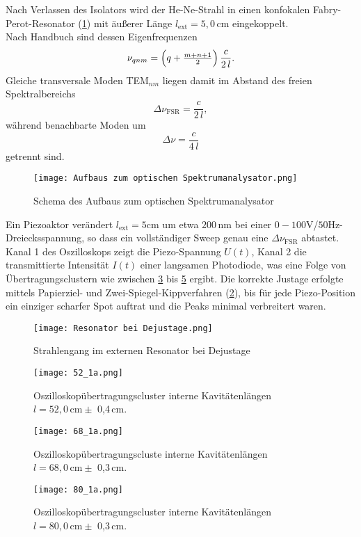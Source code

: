Nach Verlassen des Isolators wird der He-Ne-Strahl in einen konfokalen Fabry-Perot-Resonator (\cref{fig:Spektrumanalysator}) mit äußerer Länge $l_{\mathrm{ext}} = 5{,}0\,\si{\centi\meter}$ eingekoppelt. \\
Nach Handbuch \cite{praktikum} sind dessen Eigenfrequenzen
\begin{equation}
  \nu_{qnm}
  = \Bigl(q + \tfrac{m+n+1}{2}\Bigr)\,\frac{c}{2\,l}.
\end{equation}
Gleiche transversale Moden TEM$_{nm}$ liegen damit im Abstand des freien Spektralbereichs
\begin{equation*}
  \Delta\nu_{\mathrm{FSR}}
  = \frac{c}{2\,l},
\end{equation*}
während benachbarte Moden um
\begin{equation*}
  \Delta\nu
  = \frac{c}{4\,l}
\end{equation*}
getrennt sind.
\begin{figure}[htbp]
  \centering
  \texttt{[image: Aufbaus zum optischen Spektrumanalysator.png]}
  \caption{Schema des Aufbaus zum optischen Spektrumanalysator}
  \label{fig:Spektrumanalysator}
\end{figure}

Ein Piezoaktor verändert $l_{\mathrm{ext}} = 5 \si{\cm}$ um etwa $200\,\si{\nm}$ bei einer $0-100 \si{\volt}  $/$50 \si{\hertz}$-Dreiecksspannung, so dass ein vollständiger Sweep genau eine $\Delta\nu_{\mathrm{FSR}}$ abtastet. 
Kanal 1 des Oszilloskops zeigt die Piezo-Spannung $U(t)$, Kanal 2 die transmittierte Intensität $I(t)$ einer langsamen Photodiode, was eine Folge von Übertragungsclustern wie zwischen \cref{fig:9a} bis \cref{fig:9c} ergibt. 
Die korrekte Justage erfolgte mittels Papierziel- und Zwei-Spiegel-Kippverfahren (\cref{fig:Resonator}), bis für jede Piezo-Position ein einziger scharfer Spot auftrat und die Peaks minimal verbreitert waren.
\begin{figure}[htbp]
  \centering
  \texttt{[image: Resonator bei Dejustage.png]}
  \caption{Strahlengang im externen Resonator bei Dejustage}
  \label{fig:Resonator}
\end{figure}
\begin{figure}[htbp]
    \centering
    \texttt{[image: 52\_1a.png]}
     \caption{Oszilloskopübertragungscluster interne Kavitätenlängen $l = 52,0\,\si{\centi\meter} \pm$ 0{,}4\,\si{\centi\meter}.}
    \label{fig:9a}
\end{figure}
  \begin{figure}[htbp]
    \centering
    \texttt{[image: 68\_1a.png]}
     \caption{Oszilloskopübertragungscluste interne Kavitätenlängen $l = 68,0\,\si{\centi\meter} \pm$ 0{,}3\,\si{\centi\meter}.}
    \label{fig:9b}
  \end{figure}
  \newpage
  \begin{figure}[htbp]
    \centering
    \texttt{[image: 80\_1a.png]}
     \caption{Oszilloskopübertragungscluster interne Kavitätenlängen $l = 80,0\,\si{\centi\meter} \pm$ 0{,}3\,\si{\centi\meter}.}
    \label{fig:9c}
  \end{figure}
 
